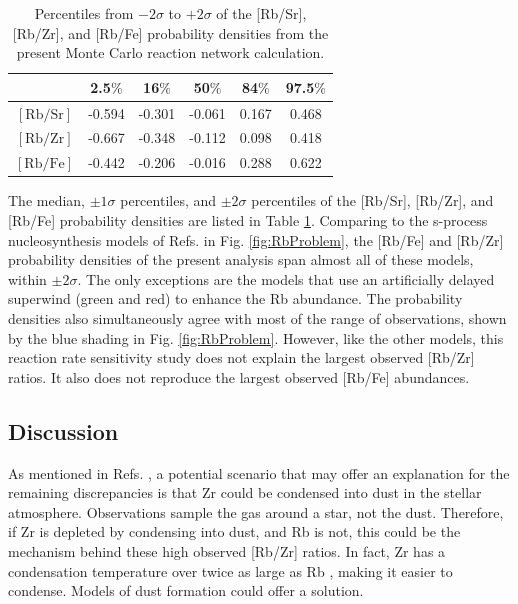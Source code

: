 \begin{table}[t]
\centering
\caption{\label{tab:Prob_Dens}Percentiles from $-2\sigma$ to $+2\sigma$ of the [Rb/Sr], [Rb/Zr], and [Rb/Fe] probability densities from the present Monte Carlo reaction network calculation.}
\begin{tabular}{cccccc}
\hline\midrule
{}&2.5$\%$&16$\%$&50$\%$&84$\%$&97.5$\%$\\ \midrule
$[\mathrm{Rb}/\mathrm{Sr}]$&-0.594&-0.301&-0.061&0.167&0.468\\
$[\mathrm{Rb}/\mathrm{Zr}]$&-0.667&-0.348&-0.112&0.098&0.418\\
$[\mathrm{Rb}/\mathrm{Fe}]$&-0.442&-0.206&-0.016&0.288&0.622\\
\hline\hline
\end{tabular}
\end{table}

The median, $\pm 1\sigma$ percentiles, and $\pm 2\sigma$ percentiles of the [Rb/Sr], [Rb/Zr], and [Rb/Fe] probability densities are listed in Table \ref{tab:Prob_Dens}. Comparing to the s-process nucleosynthesis models of Refs. \cite{Karakas2012,Raai2012,Karakas2016,Pignatari2016} in Fig. \ref{fig:RbProblem}, the [Rb/Fe] and [Rb/Zr] probability densities of the present analysis span almost all of these models, within $\pm 2\sigma$. The only exceptions are the models that use an artificially delayed superwind (green and red) to enhance the Rb abundance. The probability densities also simultaneously agree with most of the range of observations, shown by the blue shading in Fig. \ref{fig:RbProblem}. However, like the other models, this reaction rate sensitivity study does not explain the largest observed [Rb/Zr] ratios. It also does not reproduce the largest observed [Rb/Fe] abundances.

\subsection{Discussion}

As mentioned in Refs. \cite{Raai2012,Perez2017}, a potential scenario that may offer an explanation for the remaining discrepancies is that Zr could be condensed into dust in the stellar atmosphere. Observations sample the gas around a star, not the dust. Therefore, if Zr is depleted by condensing into dust, and Rb is not, this could be the mechanism behind these high observed [Rb/Zr] ratios. In fact, Zr has a condensation temperature over twice as large as Rb \cite{Raai2012}, making it easier to condense. Models of dust formation could offer a solution.

